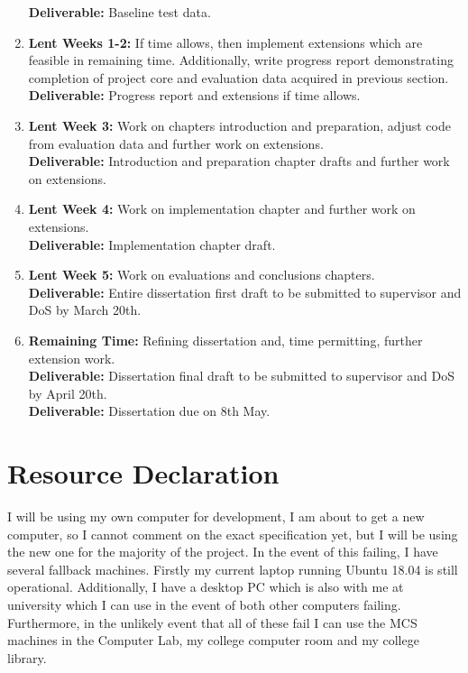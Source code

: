 \documentclass[12pt,a4paper]{article}
\begin{document}
\begin{enumerate}
		\textbf{Deliverable:} Baseline test data.
		\item \textbf{Lent Weeks 1-2:} If time allows, then implement extensions which are feasible in remaining time. Additionally, write progress report demonstrating completion of project core and evaluation data acquired in previous section.\\
		\textbf{Deliverable:} Progress report and extensions if time allows.
		\item \textbf{Lent Week 3:} Work on chapters introduction and preparation, adjust code from evaluation data and further work on extensions.\\
		\textbf{Deliverable:} Introduction and preparation chapter drafts and further work on extensions.
		\item \textbf{Lent Week 4:} Work on implementation chapter and further work on extensions.\\
		\textbf{Deliverable:} Implementation chapter draft.
		\item \textbf{Lent Week 5:} Work on evaluations and conclusions chapters.\\
		\textbf{Deliverable:} Entire dissertation first draft to be submitted to supervisor and DoS by March 20th.
		\item \textbf{Remaining Time:} Refining dissertation and, time permitting, further extension work.\\
		\textbf{Deliverable:} Dissertation final draft to be submitted to supervisor and DoS by April 20th.\\
		\textbf{Deliverable:} Dissertation due on 8th May.
	\end{enumerate}
	
	\section{Resource Declaration}
	
	I will be using my own computer for development, I am about to get a new computer, so I cannot comment on the exact specification yet, but I will be using the new one for the majority of the project. In the event of this failing, I have several fallback machines. Firstly my current laptop running Ubuntu 18.04 is still operational. Additionally, I have a desktop PC which is also with me at university which I can use in the event of both other computers failing. Furthermore, in the unlikely event that all of these fail I can use the MCS machines in the Computer Lab, my college computer room and my college library.
	
\end{document}
